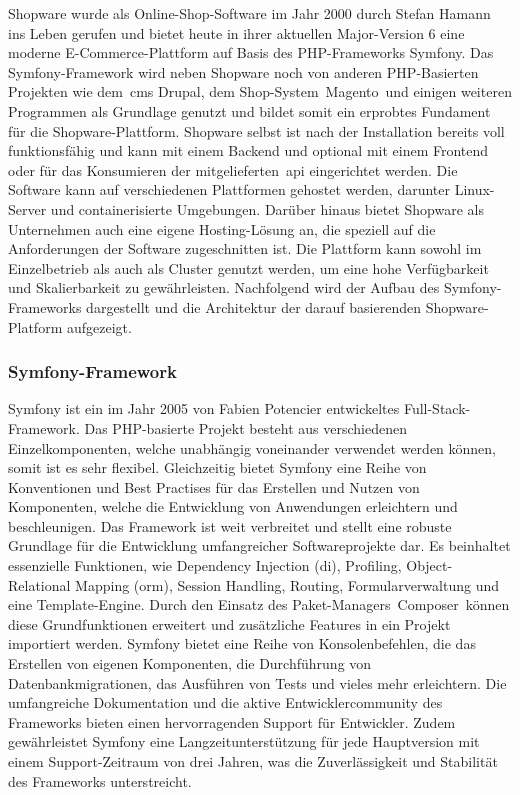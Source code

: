 Shopware wurde als Online-Shop-Software im Jahr 2000 durch Stefan Hamann ins Leben gerufen
und bietet heute in ihrer aktuellen Major-Version 6 eine moderne E-Commerce-Plattform auf Basis des PHP-Frameworks
\glqq Symfony\grqq.
Das Symfony-Framework wird neben Shopware noch von anderen PHP-Basierten Projekten wie dem\ \acrshort{cms}
\glqq Drupal\grqq, dem Shop-System\ \glqq Magento\grqq\ und einigen weiteren Programmen
als Grundlage genutzt und bildet somit ein erprobtes Fundament für die Shopware-Plattform.
Shopware selbst ist nach der Installation bereits voll funktionsfähig und kann mit einem Backend und optional
mit einem Frontend oder für das Konsumieren der mitgelieferten\ \acrshort{api} eingerichtet werden.
Die Software kann auf verschiedenen Plattformen gehostet werden, darunter Linux-Server und containerisierte Umgebungen.
Darüber hinaus bietet Shopware als Unternehmen auch eine eigene Hosting-Lösung an, die speziell auf die Anforderungen
der Software zugeschnitten ist.
Die Plattform kann sowohl im Einzelbetrieb als auch als Cluster genutzt werden, um eine hohe Verfügbarkeit und
Skalierbarkeit zu gewährleisten.
Nachfolgend wird der Aufbau des Symfony-Frameworks dargestellt und die Architektur der darauf basierenden
Shopware-Platform aufgezeigt.

\subsubsection{Symfony-Framework}

Symfony ist ein im Jahr 2005 von Fabien Potencier entwickeltes Full-Stack-Framework.
Das PHP-basierte Projekt besteht aus verschiedenen Einzelkomponenten, welche unabhängig voneinander verwendet werden
können, somit ist es sehr flexibel.
Gleichzeitig bietet Symfony eine Reihe von Konventionen und Best Practises für das Erstellen und Nutzen von Komponenten,
welche die Entwicklung von Anwendungen erleichtern und beschleunigen.
Das Framework ist weit verbreitet und stellt eine robuste Grundlage für die Entwicklung umfangreicher Softwareprojekte
dar.
Es beinhaltet essenzielle Funktionen, wie Dependency Injection (\acrshort{di}), Profiling, Object-Relational Mapping
(\acrshort{orm}), Session Handling, Routing, Formularverwaltung und eine Template-Engine.
Durch den Einsatz des Paket-Managers\ \glqq Composer\grqq\ können diese Grundfunktionen erweitert und zusätzliche
Features in ein Projekt importiert werden.
Symfony bietet eine Reihe von Konsolenbefehlen, die das Erstellen von eigenen Komponenten, die Durchführung von
Datenbankmigrationen, das Ausführen von Tests und vieles mehr erleichtern.
Die umfangreiche Dokumentation und die aktive Entwicklercommunity des Frameworks bieten einen hervorragenden Support
für Entwickler.
Zudem gewährleistet Symfony eine Langzeitunterstützung für jede Hauptversion mit einem Support-Zeitraum von drei Jahren,
was die Zuverlässigkeit und Stabilität des Frameworks unterstreicht.

